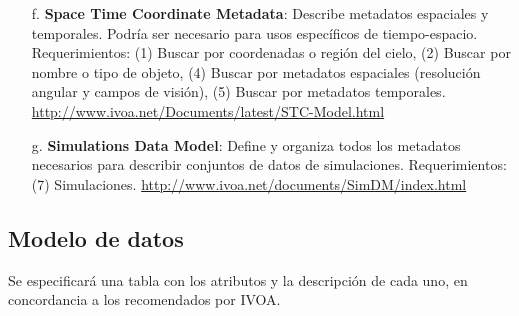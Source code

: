 \begin{enumerate}
	\item[f.] \textbf{Space Time Coordinate Metadata}: Describe metadatos espaciales y
temporales. Podría ser necesario para usos específicos de tiempo-espacio.
Requerimientos: (1) Buscar por coordenadas o región del cielo, (2) Buscar por
nombre o  tipo de objeto, (4) Buscar por metadatos espaciales (resolución
angular y campos de visión), (5) Buscar por metadatos temporales.
\url{http://www.ivoa.net/Documents/latest/STC-Model.html}

	\item[g.] \textbf{Simulations Data Model}: Define y organiza todos los metadatos
necesarios para describir conjuntos de datos de simulaciones. Requerimientos:
(7) Simulaciones. \url{http://www.ivoa.net/documents/SimDM/index.html}
\end{enumerate}

\subsection{Modelo de datos}

Se especificará una tabla con los atributos y la descripción de cada uno, en
concordancia a los recomendados por IVOA.

